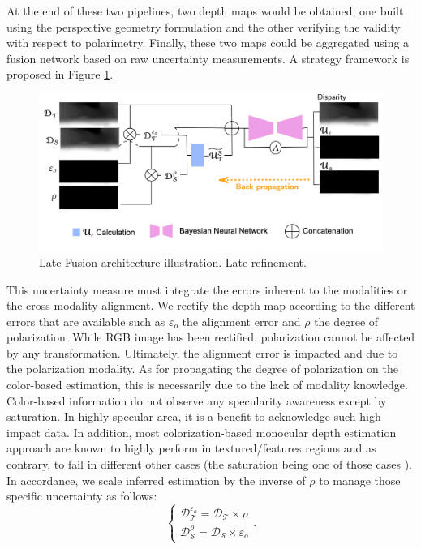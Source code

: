 At the end of these two pipelines, two depth maps would be obtained, one built using the perspective geometry formulation and the other verifying the validity with respect to polarimetry.
Finally, these two maps could be aggregated using a fusion network based on raw uncertainty measurements. A strategy framework is proposed in Figure \ref{fig:late2}.

\begin{figure}[h]
	\centering
	\includegraphics[width=0.8\linewidth]{Figures/Fusion/late2}
	\caption[Late Fusion architecture illustration. Late refinement.]{Late Fusion architecture illustration. Late refinement.}
	\label{fig:late2}
\end{figure}

This uncertainty measure must integrate the errors inherent to the modalities or the cross modality alignment.
We rectify the depth map according to the different errors that are available such as $\varepsilon_o$ the alignment error and $\rho$ the degree of polarization. While RGB image has been rectified, polarization cannot be affected by any transformation. Ultimately, the alignment error is impacted and due to the polarization modality. As for propagating the degree of polarization on the color-based estimation, this is necessarily due to the lack of modality knowledge. Color-based information do not observe any specularity awareness except by saturation. In highly specular area, it is a benefit to acknowledge such high impact data. In addition, most colorization-based monocular depth estimation approach are known to highly perform in textured/features regions and as contrary, to fail in different other cases (the saturation being one of those cases ). In accordance, we scale inferred estimation by the inverse of $\rho$ to manage those specific uncertainty as follows:
\begin{equation}
\begin{cases}  
\mathcal{D}_{\mathcal{T}}^{\varepsilon_o} =  \mathcal{D}_{\mathcal{T}} \times \rho\\[8pt] 

\mathcal{D}_{\mathcal{S}}^{\rho} =  \mathcal{D}_{\mathcal{S}} \times \varepsilon_o

\end{cases}.
\end{equation}

